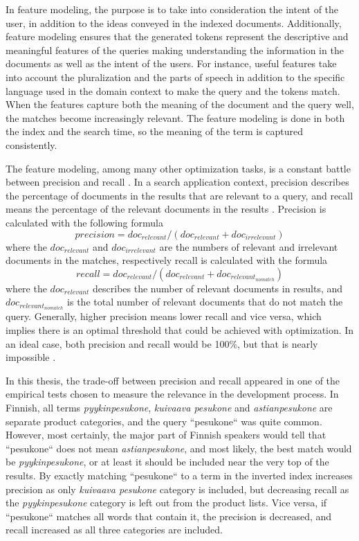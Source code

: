 In feature modeling, the purpose is to take into consideration the intent of the user, 
in addition to the ideas conveyed in the indexed documents.
Additionally, feature modeling ensures that the generated tokens represent the descriptive and meaningful
features of the queries making understanding the information in the documents as well as the intent of the users.
For instance, useful features take into account the pluralization and the parts of speech in addition to the specific language
used in the domain context to make the query and the tokens match.
When the features capture both the meaning of the document and the query well, 
the matches become increasingly relevant.
The feature modeling is done in both the index and the search time, so the meaning of the term is captured consistently.
\cite{relevantSearch}

The feature modeling, among many other optimization tasks, is a constant battle between 
precision and recall \cite{relevantSearch}.
In a search application context, precision describes the percentage of documents in the results 
that are relevant to a query, and recall means the percentage of the relevant documents in the results
\cite{relevantSearch}.
Precision is calculated with the following formula
\[ precision = doc_{relevant} / (doc_{relevant} + doc_{irrelevant}) \]
where the $doc_{relevant}$ and $doc_{irrelevant}$ are
the numbers of relevant and irrelevant documents in the matches,
respectively recall is calculated with the formula
\[ recall = doc_{relevant} / (doc_{relevant} + doc_{relevant_{no match}}) \]
where the $doc_{relevant}$ describes the number of relevant documents in results, 
and $doc_{relevant_{no match}}$ is the total number of relevant documents that do not match
the query.
Generally, higher precision means lower recall and vice versa, which implies there is an optimal threshold 
that could be achieved with optimization.
In an ideal case, both precision and recall would be 100\%, but that is nearly impossible \cite{relevantSearch}.


In this thesis, the trade-off between precision and recall appeared in one of the empirical tests 
chosen to measure the relevance in the development process.
In Finnish, all terms
\emph{pyykinpesukone}, \emph{kuivaava pesukone} and \emph{astianpesukone} 
are separate product categories, and the query ``pesukone`` was quite common.
However, most certainly, the major part of Finnish speakers would tell that ``pesukone`` does not mean 
\emph{astianpesukone}, and most likely, the best match would be \emph{pyykinpesukone}, or 
at least it should be included near the very top of the results.
By exactly matching ``pesukone`` to a term in the inverted index increases precision as only \emph{kuivaava pesukone} category 
is included, but decreasing recall as the \emph{pyykinpesukone} category is left out from the product lists.
Vice versa, if ``pesukone`` matches all words that contain it, the precision is decreased, and recall increased as all
three categories are included.

